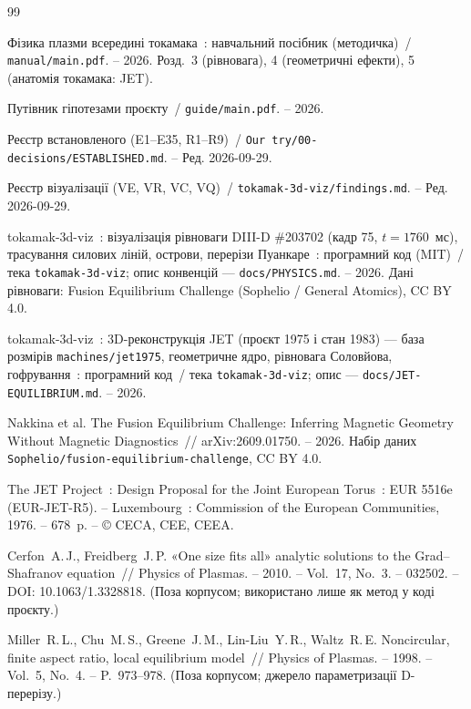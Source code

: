 \begin{thebibliography}{99}
\footnotesize\raggedright
{}

 Фізика плазми всередині токамака~: навчальний посібник (методичка)~/ \texttt{manual/main.pdf}. -- 2026.
  Розд.~3 (рівновага), 4 (геометричні ефекти), 5 (анатомія токамака: JET).

 Путівник гіпотезами проєкту~/ \texttt{guide/main.pdf}. -- 2026.

 Реєстр встановленого (E1--E35, R1--R9)~/ \texttt{Our try/00-decisions/ESTABLISHED.md}. -- Ред. 2026-09-29.

 Реєстр візуалізації (VE, VR, VC, VQ)~/ \texttt{tokamak-3d-viz/findings.md}. -- Ред. 2026-09-29.

 tokamak-3d-viz~: візуалізація рівноваги DIII-D \#203702 (кадр 75, $t=1760$~мс),
  трасування силових ліній, острови, перерізи Пуанкаре~: програмний код (MIT)~/
  тека \texttt{tokamak-3d-viz}; опис конвенцій --- \texttt{docs/PHYSICS.md}. -- 2026. Дані рівноваги: Fusion Equilibrium Challenge
  (Sophelio / General Atomics), CC BY 4.0.

 tokamak-3d-viz~: 3D-реконструкція JET (проєкт 1975 і стан 1983) --- база розмірів
  \texttt{machines/jet1975}, геометричне ядро, рівновага Соловйова, гофрування~: програмний код~/
  тека \texttt{tokamak-3d-viz}; опис --- \texttt{docs/JET-EQUILIBRIUM.md}. -- 2026.

 Nakkina et al. The Fusion Equilibrium Challenge: Inferring Magnetic Geometry
  Without Magnetic Diagnostics~// arXiv:2609.01750. -- 2026. Набір даних
  \texttt{Sophelio/fusion-equilibrium-challenge}, CC BY 4.0.

 The JET Project~: Design Proposal for the Joint European Torus~: EUR 5516e (EUR-JET-R5). --
  Luxembourg~: Commission of the European Communities, 1976. -- 678~p. -- © CECA, CEE, CEEA.

 Cerfon~A.\,J., Freidberg~J.\,P. «One size fits all» analytic solutions to the Grad--Shafranov
  equation~// Physics of Plasmas. -- 2010. -- Vol.~17, No.~3. -- 032502. -- DOI: 10.1063/1.3328818.
  (Поза корпусом; використано лише як метод у коді проєкту.)

 Miller~R.\,L., Chu~M.\,S., Greene~J.\,M., Lin-Liu~Y.\,R., Waltz~R.\,E. Noncircular, finite aspect
  ratio, local equilibrium model~// Physics of Plasmas. -- 1998. -- Vol.~5, No.~4. -- P.~973--978.
  (Поза корпусом; джерело параметризації D-перерізу.)

\end{thebibliography}
